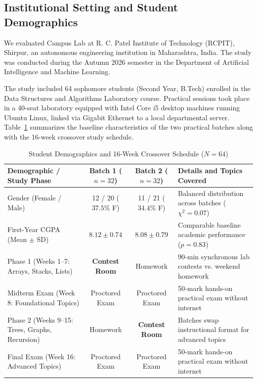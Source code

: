 \documentclass[12pt,a4paper]{article}
\begin{document}
\subsection{Institutional Setting and Student Demographics}
We evaluated Campus Lab at R. C. Patel Institute of Technology (RCPIT), Shirpur, an autonomous engineering institution in Maharashtra, India. The study was conducted during the Autumn 2026 semester in the Department of Artificial Intelligence and Machine Learning.

The study included 64 sophomore students (Second Year, B.Tech) enrolled in the Data Structures and Algorithms Laboratory course. Practical sessions took place in a 40-seat laboratory equipped with Intel Core i5 desktop machines running Ubuntu Linux, linked via Gigabit Ethernet to a local departmental server. Table~\ref{tab:demographics_schedule} summarizes the baseline characteristics of the two practical batches along with the 16-week crossover study schedule.

\begin{table}[!htbp]
\centering
\small
\caption{Student Demographics and 16-Week Crossover Schedule ($N = 64$)}
\label{tab:demographics_schedule}
\begin{tabularx}{\linewidth}{|l|c|c|X|}
\hline
\textbf{Demographic / Study Phase} & \textbf{Batch 1 ($n = 32$)} & \textbf{Batch 2 ($n = 32$)} & \textbf{Details and Topics Covered} \\
\hline
Gender (Female / Male) & 12 / 20 ($37.5\%$ F) & 11 / 21 ($34.4\%$ F) & Balanced distribution across batches ($\chi^2 = 0.07$) \\
\hline
First-Year CGPA (Mean $\pm$ SD) & $8.12 \pm 0.74$ & $8.08 \pm 0.79$ & Comparable baseline academic performance ($p = 0.83$) \\
\hline
Phase 1 (Weeks 1--7: Arrays, Stacks, Lists) & \textbf{Contest Room} & Homework & 90-min synchronous lab contests vs. weekend homework \\
\hline
Midterm Exam (Week 8: Foundational Topics) & Proctored Exam & Proctored Exam & 50-mark hands-on practical exam without internet \\
\hline
Phase 2 (Weeks 9--15: Trees, Graphs, Recursion) & Homework & \textbf{Contest Room} & Batches swap instructional format for advanced topics \\
\hline
Final Exam (Week 16: Advanced Topics) & Proctored Exam & Proctored Exam & 50-mark hands-on practical exam without internet \\
\hline
\end{tabularx}
\end{table}
\end{document}
